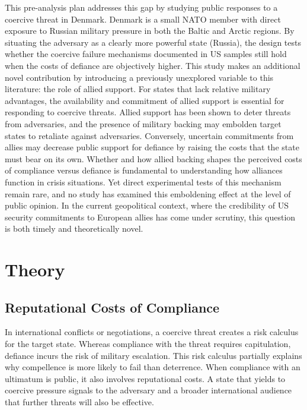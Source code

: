 This pre-analysis plan addresses this gap by studying public responses to a coercive threat in Denmark. Denmark is a small NATO member with direct exposure to Russian military pressure in both the Baltic and Arctic regions. By situating the adversary as a clearly more powerful state (Russia), the design tests whether the coercive failure mechanisms documented in US samples still hold when the costs of defiance are objectively higher. This study makes an additional novel contribution by introducing a previously unexplored variable to this literature: the role of allied support. For states that lack relative military advantages, the availability and commitment of allied support is essential for responding to coercive threats. Allied support has been shown to deter threats from adversaries, and the presence of military backing may embolden target states to retaliate against adversaries. \autocite{leeds_alliances_2003, fang_concede_2014, benson_inducing_2014} Conversely, uncertain commitments from allies may decrease public support for defiance by raising the costs that the state must bear on its own. Whether and how allied backing shapes the perceived costs of compliance versus defiance is fundamental to understanding how alliances function in crisis situations. Yet direct experimental tests of this mechanism remain rare, and no study has examined this emboldening effect at the level of public opinion. In the current geopolitical context, where the credibility of US security commitments to European allies has come under scrutiny, this question is both timely and theoretically novel.  

\section{Theory}

\subsection{Reputational Costs of Compliance}
In international conflicts or negotiations, a coercive threat creates a risk calculus for the target state. Whereas compliance with the threat requires capitulation, defiance incurs the risk of military escalation.\autocite{schelling_arms_1966} This risk calculus partially explains why compellence is more likely to fail than deterrence.\autocite{schelling_arms_1966} When compliance with an ultimatum is public, it also involves reputational costs. A state that yields to coercive pressure signals to the adversary and a broader international audience that further threats will also be effective. 

